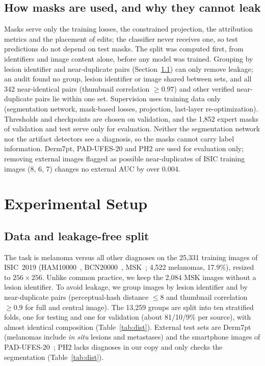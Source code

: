 \documentclass[conference]{IEEEtran}
\begin{document}
\subsection{How masks are used, and why they cannot leak}
Masks serve only the training losses, the constrained projection, the attribution metrics and the placement of edits; the classifier never receives one, so test predictions do not depend on test masks. The split was computed first, from identifiers and image content alone, before any model was trained. Grouping by lesion identifier and near-duplicate pairs (Section~\ref{sec:data}) can only remove leakage; an audit found no group, lesion identifier or image shared between sets, and all 342 near-identical pairs (thumbnail correlation $\geq0.97$) and other verified near-duplicate pairs lie within one set. Supervision uses training data only (segmentation network, mask-based losses, projection, last-layer re-optimization). Thresholds and checkpoints are chosen on validation, and the 1{,}852 expert masks of validation and test serve only for evaluation. Neither the segmentation network nor the artifact detectors see a diagnosis, so the masks cannot carry label information. Derm7pt, PAD-UFES-20 and PH2 are used for evaluation only; removing external images flagged as possible near-duplicates of ISIC training images (8, 6, 7) changes no external AUC by over 0.004.

\section{Experimental Setup}
\subsection{Data and leakage-free split}
\label{sec:data}
The task is melanoma versus all other diagnoses on the 25{,}331 training images of ISIC~2019 (HAM10000~\cite{tschandl2018}, BCN20000~\cite{combalia2019}, MSK~\cite{codella2018}; 4{,}522 melanomas, 17.9\%), resized to $256\times256$. Unlike common practice, we keep the 2{,}084 MSK images without a lesion identifier. To avoid leakage, we group images by lesion identifier and by near-duplicate pairs (perceptual-hash distance $\leq8$ and thumbnail correlation $\geq0.9$ for full and central image). The 13{,}259 groups are split into ten stratified folds, one for testing and one for validation (about 81/10/9\% per source), with almost identical composition (Table~\ref{tab:dist}). External test sets are Derm7pt~\cite{kawahara2019} (melanomas include \emph{in situ} lesions and metastases) and the smartphone images of PAD-UFES-20~\cite{pacheco2020}; PH2 lacks diagnoses in our copy and only checks the segmentation (Table~\ref{tab:dist}).
\end{document}
